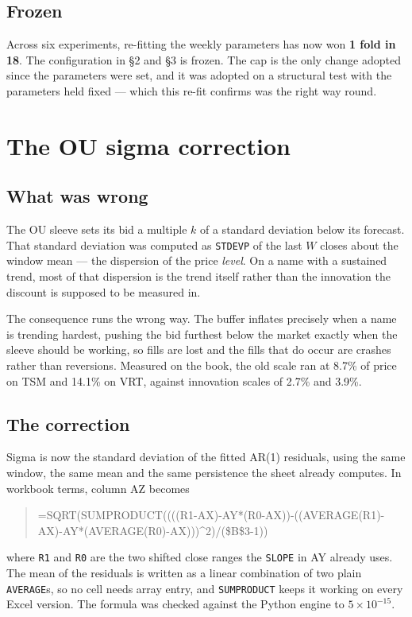 \documentclass[11pt]{article}
\begin{document}
\subsection{Frozen}

Across six experiments, re-fitting the weekly parameters has now won \textbf{1 fold in 18}. The
configuration in \S2 and \S3 is frozen. The cap is the only change adopted since the parameters
were set, and it was adopted on a structural test with the parameters held fixed --- which this
re-fit confirms was the right way round.

\section{The OU sigma correction}

\subsection{What was wrong}

The OU sleeve sets its bid a multiple $k$ of a standard deviation below its forecast. That
standard deviation was computed as \texttt{STDEVP} of the last $W$ closes about the window mean
--- the dispersion of the price \emph{level}. On a name with a sustained trend, most of that
dispersion is the trend itself rather than the innovation the discount is supposed to be measured
in.

The consequence runs the wrong way. The buffer inflates precisely when a name is trending
hardest, pushing the bid furthest below the market exactly when the sleeve should be working, so
fills are lost and the fills that do occur are crashes rather than reversions. Measured on the
book, the old scale ran at 8.7\% of price on TSM and 14.1\% on VRT, against innovation scales of
2.7\% and 3.9\%.

\subsection{The correction}

Sigma is now the standard deviation of the fitted AR(1) residuals, using the same window, the
same mean and the same persistence the sheet already computes. In workbook terms, column AZ
becomes
\begin{quote}\footnotesize\ttfamily
=SQRT(SUMPRODUCT((((R1-AX)-AY*(R0-AX))-((AVERAGE(R1)-AX)-AY*(AVERAGE(R0)-AX)))\^{}2)/(\$B\$3-1))
\end{quote}
where \texttt{R1} and \texttt{R0} are the two shifted close ranges the \texttt{SLOPE} in AY
already uses. The mean of the residuals is written as a linear combination of two plain
\texttt{AVERAGE}s, so no cell needs array entry, and \texttt{SUMPRODUCT} keeps it working on every
Excel version. The formula was checked against the Python engine to $5\times10^{-15}$.
\end{document}
